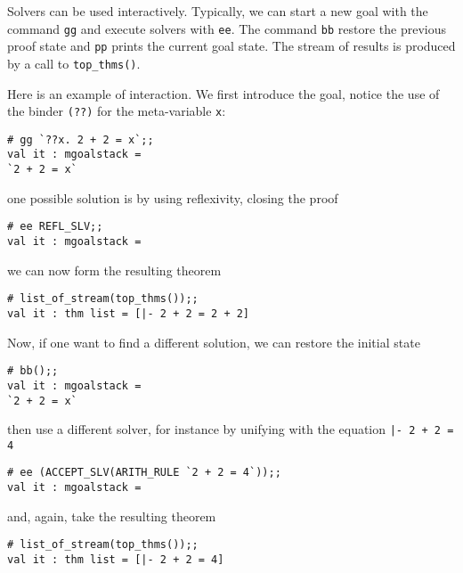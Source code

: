
Solvers can be used interactively.  Typically, we can start a new goal
with the command \verb|gg| and execute solvers with \verb|ee|.  The
command \verb|bb| restore the previous proof state and \verb|pp|
prints the current goal state.  The stream of results is produced by
a call to \verb|top_thms()|.

Here is an example of interaction.  We first introduce the goal,
notice the use of the binder \verb|(??)| for the meta-variable \verb|x|:
\begin{verbatim}
# gg `??x. 2 + 2 = x`;;
val it : mgoalstack =
`2 + 2 = x`
\end{verbatim}
one possible solution is by using reflexivity, closing the proof
\begin{verbatim}
# ee REFL_SLV;;
val it : mgoalstack =
\end{verbatim}
we can now form the resulting theorem
\begin{verbatim}
# list_of_stream(top_thms());;
val it : thm list = [|- 2 + 2 = 2 + 2]
\end{verbatim}

Now, if one want to find a different solution, we can restore the
initial state
\begin{verbatim}
# bb();;
val it : mgoalstack =
`2 + 2 = x`
\end{verbatim}
then use a different solver, for instance by unifying with the
equation \verb?|- 2 + 2 = 4?
\begin{verbatim}
# ee (ACCEPT_SLV(ARITH_RULE `2 + 2 = 4`));;
val it : mgoalstack =
\end{verbatim}
and, again, take the resulting theorem
\begin{verbatim}
# list_of_stream(top_thms());;
val it : thm list = [|- 2 + 2 = 4]
\end{verbatim}

